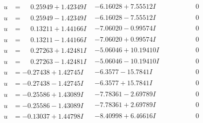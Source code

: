 \documentclass[1p]{elsarticle_modified}
\theoremstyle{definition}
\begin{document}
$$\begin{array}{c|c|c}
\begin{aligned}
u &= \phantom{-}0.25949 + 1.42349 I\end{aligned}
 & -6.16028 + 7.55512 I & \phantom{-0.000000 } 0 \\ \hline\begin{aligned}
u &= \phantom{-}0.25949 - 1.42349 I\end{aligned}
 & -6.16028 - 7.55512 I & \phantom{-0.000000 } 0 \\ \hline\begin{aligned}
u &= \phantom{-}0.13211 + 1.44166 I\end{aligned}
 & -7.06020 - 0.99574 I & \phantom{-0.000000 } 0 \\ \hline\begin{aligned}
u &= \phantom{-}0.13211 - 1.44166 I\end{aligned}
 & -7.06020 + 0.99574 I & \phantom{-0.000000 } 0 \\ \hline\begin{aligned}
u &= \phantom{-}0.27263 + 1.42481 I\end{aligned}
 & -5.06046 + 10.19410 I & \phantom{-0.000000 } 0 \\ \hline\begin{aligned}
u &= \phantom{-}0.27263 - 1.42481 I\end{aligned}
 & -5.06046 - 10.19410 I & \phantom{-0.000000 } 0 \\ \hline\begin{aligned}
u &= -0.27438 + 1.42745 I\end{aligned}
 & -6.3577 - 15.7841 I & \phantom{-0.000000 } 0 \\ \hline\begin{aligned}
u &= -0.27438 - 1.42745 I\end{aligned}
 & -6.3577 + 15.7841 I & \phantom{-0.000000 } 0 \\ \hline\begin{aligned}
u &= -0.25586 + 1.43089 I\end{aligned}
 & -7.78361 - 2.69789 I & \phantom{-0.000000 } 0 \\ \hline\begin{aligned}
u &= -0.25586 - 1.43089 I\end{aligned}
 & -7.78361 + 2.69789 I & \phantom{-0.000000 } 0 \\ \hline\begin{aligned}
u &= -0.13037 + 1.44798 I\end{aligned}
 & -8.40998 + 6.46616 I & \phantom{-0.000000 } 0 \\ \hline\begin{aligned}

\end{aligned}
\end{array}$$
\end{document}
